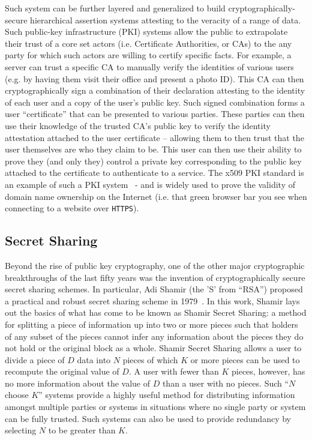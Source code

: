Such system can be further layered and generalized to build
cryptographically-secure hierarchical assertion systems attesting to
the veracity of a range of data. Such public-key infrastructure (PKI)
systems allow the public to extrapolate their trust of a core set
actors (i.e. Certificate Authorities, or CAs) to the any party for
which such actors are willing to certify specific facts. For example,
a server can trust a specific CA to manually verify the identities of
various users (e.g. by having them visit their office and present a
photo ID). This CA can then cryptographically sign a combination of
their declaration attesting to the identity of each user and a copy of
the user's public key. Such signed combination forms a user
``certificate'' that can be presented to various parties. These
parties can then use their knowledge of the trusted CA's public key to
verify the identity attestation attached to the user certificate --
allowing them to then trust that the user themselves are who they
claim to be. This user can then use their ability to prove they (and
only they) control a private key corresponding to the public key
attached to the certificate to authenticate to a service. The x509 PKI
standard is an example of such a PKI system~\cite{rfc5280} - and is
widely used to prove the validity of domain name ownership on the
Internet (i.e. that green browser bar you see when connecting to a
website over \texttt{HTTPS}).

\subsection{Secret Sharing}

Beyond the rise of public key cryptography, one of the other major
cryptographic breakthroughs of the last fifty years was the invention
of cryptographically secure secret sharing schemes. In particular, Adi
Shamir (the 'S' from ``RSA'') proposed a practical and robust secret
sharing scheme in 1979~\cite{shamir1979}. In this work, Shamir lays
out the basics of what has come to be known as Shamir Secret Sharing:
a method for splitting a piece of information up into two or more
pieces such that holders of any subset of the pieces cannot infer any
information about the pieces they do not hold or the original block as
a whole. Shamir Secret Sharing allows a user to divide a piece of $D$
data into $N$ pieces of which $K$ or more pieces can be used to
recompute the original value of $D$. A user with fewer than $K$
pieces, however, has no more information about the value of $D$ than a
user with no pieces. Such ``$N$ choose $K$'' systems provide a highly
useful method for distributing information amongst multiple parties or
systems in situations where no single party or system can be fully
trusted. Such systems can also be used to provide redundancy by
selecting $N$ to be greater than $K$.

